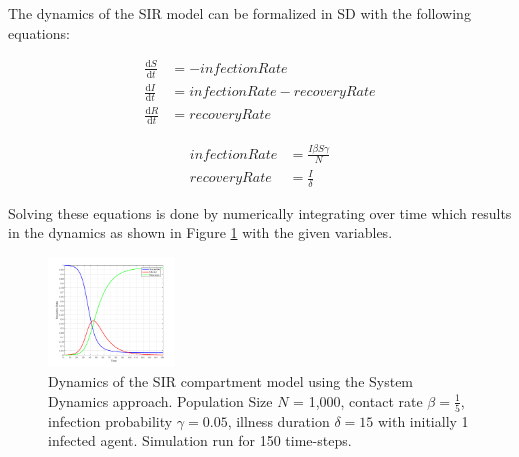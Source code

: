 The dynamics of the SIR model can be formalized in SD with the following equations:


\begin{align}
\frac{\mathrm d S}{\mathrm d t} &= -infectionRate \\ 
\frac{\mathrm d I}{\mathrm d t} &= infectionRate - recoveryRate \\ 
\frac{\mathrm d R}{\mathrm d t} &= recoveryRate 
\end{align}

\begin{align}
infectionRate &= \frac{I \beta S \gamma}{N} \\
recoveryRate &= \frac{I}{\delta} 
\end{align}

Solving these equations is done by numerically integrating over time which results in the dynamics as shown in Figure \ref{fig:sir_sd_dynamics} with the given variables.

\begin{figure}
	\centering
	\includegraphics[width=0.3\textwidth, angle=0]{./fig/step3_dataflow/SIR_SD_1000agents_150t_001dt.png}
	\caption{Dynamics of the SIR compartment model using the System Dynamics approach. Population Size $N$ = 1,000, contact rate $\beta =  \frac{1}{5}$, infection probability $\gamma = 0.05$, illness duration $\delta = 15$ with initially 1 infected agent. Simulation run for 150 time-steps.}
	\label{fig:sir_sd_dynamics}
\end{figure}

